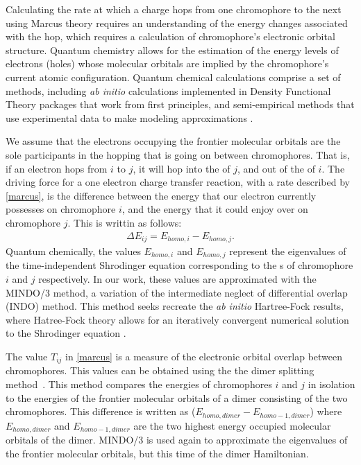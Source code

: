 Calculating the rate at which a charge hops from one chromophore to the next
using Marcus theory requires an understanding of the energy changes associated with the hop, 
which requires a calculation of chromophore's electronic orbital structure.
Quantum chemistry allows for the estimation of the energy levels of electrons (holes) whose molecular orbitals 
are implied by the chromophore's current atomic configuration. 
Quantum chemical calculations comprise a set of methods, including \textit{ab initio} calculations implemented 
in Density Functional Theory packages that work from first principles, 
and semi-empirical methods that use experimental data to make modeling approximations \cite{Cui2014a}.

We assume that the electrons occupying the frontier molecular orbitals are the sole participants in the
hopping that is going on between chromophores. That is, if an electron hops from $i$ to $j$, it will hop
into the  of $j$, and out of the
 of $i$.
The driving force for a one electron charge transfer reaction, 
with a rate described by \autoref{marcus}, is the difference between the energy that our electron 
currently possesses
on chromophore $i$, and the energy that it could enjoy over on chromophore $j$. 
This is writtin as follows:
\begin{align}
    \Delta E_{ij} = E_{homo, i} - E_{homo, j}.
    \label{gibbs}
\end{align}
Quantum chemically, the values $E_{homo, i}$ and $E_{homo, j}$ represent the eigenvalues of the
time-independent Shrodinger equation corresponding to the s of chromophore $i$ and $j$ respectively. 
In our work, these values are approximated with the MINDO/3 method, a variation of the intermediate neglect of 
differential overlap (INDO) method. This method seeks recreate the \textit{ab initio} Hartree-Fock
results, where Hatree-Fock theory allows for an iteratively convergent numerical solution to the
Shrodinger equation \cite{Thiel2014}. 

The value $T_{ij}$ in \autoref{marcus} is a measure of the electronic orbital overlap between chromophores.
This values can be obtained using the
the dimer splitting method~\cite{Huang2005b}. This method compares the  energies of chromophores $i$ and
$j$ in isolation to the energies of the frontier molecular orbitals of a dimer
consisting of the two chromophores. 
This difference is written as ($E_{homo,dimer} - E_{homo-1,dimer}$) where $E_{homo,dimer}$ 
and $E_{homo-1,dimer}$ are the two highest energy occupied molecular orbitals of the dimer. MINDO/3 is used
again to approximate the eigenvalues of the frontier molecular orbitals, but this time of the dimer
Hamiltonian. 

